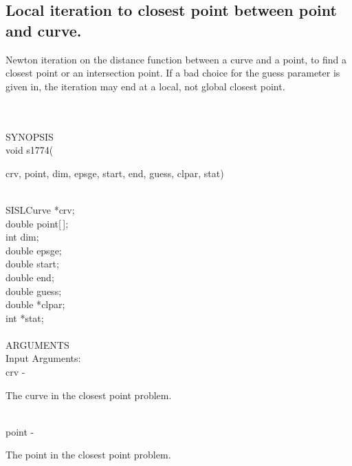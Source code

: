 \subsection{Local iteration to closest point between point and curve.}
\begin{minipg1}
Newton iteration on the distance function between
               a curve and a point, to find a closest point or an
               intersection point.
               If a bad choice for the guess parameter is given in, the
               iteration may end at a local, not global closest point.
\end{minipg1} \\ \\
SYNOPSIS\\
        \> void s1774(\begin{minipg3}
            {\fov crv},  {\fov point},  {\fov dim},  {\fov epsge},  {\fov start},  {\fov end},  {\fov guess},  {\fov clpar},  {\fov stat})
                \end{minipg3}\\
                \>\>    SISLCurve \> *{\fov crv};\\
                \>\>    double \> {\fov point}[\,];\\
                \>\>    int \> {\fov dim};\\
                \>\>    double \> {\fov epsge};\\
                \>\>    double \> {\fov start};\\
                \>\>    double \> {\fov end};\\
                \>\>    double \> {\fov guess};\\
                \>\>    double \> *{\fov clpar};\\
                \>\>    int \> *{\fov stat};\\
\\
ARGUMENTS\\
	\>Input Arguments:\\
        \>\>    {\fov crv}\> - \>  \begin{minipg2}
                     The curve in the closest point problem.
                               \end{minipg2}\\
        \>\>    {\fov point}\> - \>  \begin{minipg2}
                     The point in the closest point problem.
                               \end{minipg2}\\

